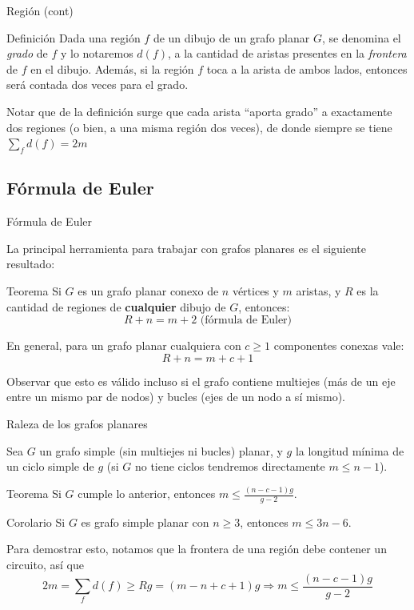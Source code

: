 \documentclass[compress]{beamer}
\begin{document}
\begin{frame}{Región (cont)}

\begin{block}{Definición}
    Dada una región $f$ de un dibujo de un grafo planar $G$, se denomina el \textit{grado} de $f$ y lo notaremos $d(f)$, a la cantidad de aristas presentes en la \textit{frontera} de $f$ en el dibujo. Además, si la región $f$ toca
    a la arista de ambos lados, entonces será contada dos veces para el grado.
\end{block}

Notar que de la definición surge que cada arista ``aporta grado'' a exactamente dos regiones (o bien, a una misma región dos veces), de donde siempre se tiene $\sum_f {d(f)} = 2m$

\end{frame}

\subsection{Fórmula de Euler}

\begin{frame}{Fórmula de Euler}

La principal herramienta para trabajar con grafos planares es el siguiente resultado:

\begin{block}{Teorema}
    Si $G$ es un grafo planar conexo de $n$ vértices y $m$ aristas, y $R$ es la cantidad de regiones de \textbf{cualquier} dibujo de $G$, entonces:    
    $$R + n = m + 2 \mbox{ (fórmula de Euler)}$$
    
    En general, para un grafo planar cualquiera con $c \geq 1$ componentes conexas vale:    
    $$R + n = m + c + 1$$
\end{block}

Observar que esto es válido incluso si el grafo contiene multiejes (más de un eje entre un mismo par de nodos) y bucles (ejes de un nodo a sí mismo).

\end{frame}

\begin{frame}{Raleza de los grafos planares}

Sea $G$ un grafo simple (sin multiejes ni bucles) planar, y $g$ la longitud mínima de un ciclo simple de $g$ (si $G$ no tiene ciclos tendremos directamente $m \leq n-1$).

\begin{block}{Teorema}
    Si $G$ cumple lo anterior, entonces $m \leq \frac{(n-c-1)g}{g-2}$.
\end{block}
\begin{block}{Corolario}
    Si $G$ es grafo simple planar con $n \geq 3$, entonces $m \leq 3n - 6$.
\end{block}

Para demostrar esto, notamos que la frontera de una región debe contener un circuito, así que
$$2m = \sum_f {d(f)} \geq R g = (m-n+c+1) g \Rightarrow m \leq \frac{(n-c-1)g}{g-2}$$

\end{frame}
\end{document}
